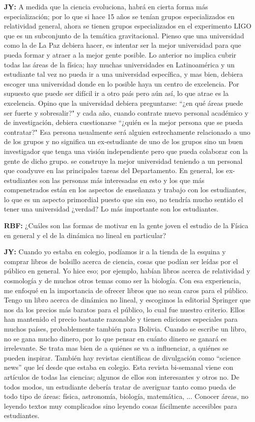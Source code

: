 \documentclass{rbf}
\newcommand{\mr}{{\bf RBF: }}
\newcommand{\jim}{{\bf JY: }}
\begin{document}
\jim A medida que la ciencia evoluciona, habrá en cierta forma más especialización; por lo que si hace 15 años se tenían grupos especializados en relatividad general, ahora se tienen grupos especializados en el experimento LIGO que es un subconjunto de la temática gravitacional. Pienso que una universidad como la de La Paz debiera hacer, es intentar ser la mejor universidad para que pueda formar y atraer a la mejor gente posible. Lo anterior no implica cubrir todas las áreas de la física; hay muchas universidades en Latinoamérica y un estudiante tal vez no pueda ir a una universidad específica, y mas bien, debiera escoger una universidad donde en lo posible haya un centro de excelencia. Por supuesto que puede ser difícil ir a otro país pero aún así, lo que atrae es la excelencia. Opino que la universidad debiera preguntarse: ``¿en qué áreas puede ser fuerte y sobresalir?" y cada año, cuando contrate nuevo personal académico y de investigación, debiera cuestionarse ``¿quién es la mejor persona que se pueda contratar?" Esa persona usualmente será alguien estrechamente relacionado a uno de los grupos y no significa un ex-estudiante de uno de los grupos sino un buen investigador que tenga una visión independiente pero que pueda colaborar con la gente de dicho grupo. se construye la mejor universidad teniendo a un personal que coadyuve en las principales tareas del Departamento. En general, los ex-estudiantes son las personas más interesadas en esto y los que más compenetrados están en los aspectos de enseñanza y trabajo con los estudiantes, lo que es un aspecto primordial puesto que sin eso, no tendría mucho sentido el tener una universidad ¿verdad? Lo más importante son los estudiantes.

\mr ¿Cuáles son las formas de motivar en la gente joven el estudio de la Física en general y el de la dinámica no lineal en particular?

\jim Cuando yo estaba en colegio, podíamos ir a la tienda de la esquina y comprar libros de bolsillo acerca de ciencia, cosas que podían ser leídas por el público en general. Yo hice eso; por ejemplo, habían libros acerca de relatividad y cosmología y de muchos otros temas como ser la biología. Con esa experiencia, me enfoqué en la importancia de ofrecer libros que no sean caros para el público. Tengo un libro acerca de dinámica no lineal, y escogimos la editorial Springer que nos da los precios más baratos para el público, lo cual fue nuestro criterio. Ellos han mantenido el precio bastante razonable y tienen ediciones especiales para muchos países, probablemente también para Bolivia. Cuando se escribe un libro, no se gana mucho dinero, por lo que pensar en cuánto dinero se ganará es irrelevante. Se trata mas bien de a quiénes se va a influenciar, a quiénes se pueden inspirar. También hay revistas
científicas de divulgación como ``science news'' que leí desde que estaba en colegio. Esta revista bi-semanal viene con artículos de todas las ciencias; algunos de ellos son interesantes y otros no. De todos modos, un estudiante debería tratar de averiguar tanto como pueda de todo tipo de áreas: física, astronomía, biología, matemática, ... Conocer áreas, no leyendo textos muy complicados sino leyendo cosas fácilmente accesibles para estudiantes.
\end{document}
